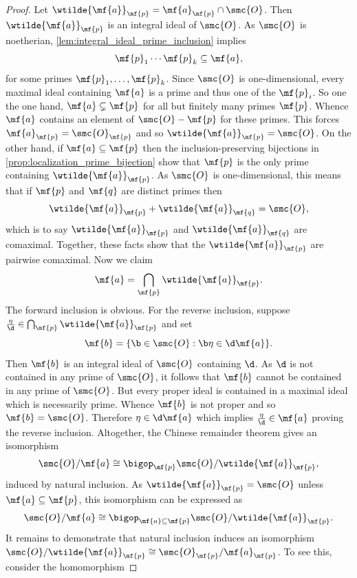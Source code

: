     \begin{proof}
      Let \(\wtilde{\mf{a}}_{\mf{p}} = \mf{a}_{\mf{p}} \cap \smc{O}\). Then \(\wtilde{\mf{a}}_{\mf{p}}\) is an integral ideal of \(\smc{O}\). As \(\smc{O}\) is noetherian, \cref{lem:integral_ideal_prime_inclusion} implies
      \[
        \mf{p}_{1} \cdots \mf{p}_{k} \subseteq \mf{a},
      \]
      for some primes \(\mf{p}_{1},\ldots,\mf{p}_{k}\). Since \(\smc{O}\) is one-dimensional, every maximal ideal containing \(\mf{a}\) is a prime and thus one of the \(\mf{p}_{i}\). So one the one hand, \(\mf{a} \subsetneq \mf{p}\) for all but finitely many primes \(\mf{p}\). Whence \(\mf{a}\) contains an element of \(\smc{O}-\mf{p}\) for these primes. This forces \(\mf{a}_{\mf{p}} = \smc{O}_{\mf{p}}\) and so \(\wtilde{\mf{a}}_{\mf{p}} = \smc{O}\). On the other hand, if \(\mf{a} \subseteq \mf{p}\) then the inclusion-preserving bijections in \cref{prop:localization_prime_bijection} show that \(\mf{p}\) is the only prime containing \(\wtilde{\mf{a}}_{\mf{p}}\). As \(\smc{O}\) is one-dimensional, this means that if \(\mf{p}\) and \(\mf{q}\) are distinct primes then
      \[
        \wtilde{\mf{a}}_{\mf{p}}+\wtilde{\mf{a}}_{\mf{q}} = \smc{O},
      \]
      which is to say \(\wtilde{\mf{a}}_{\mf{p}}\) and \(\wtilde{\mf{a}}_{\mf{q}}\) are comaximal. Together, these facts show that the \(\wtilde{\mf{a}}_{\mf{p}}\) are pairwise comaximal. Now we claim
      \[
        \mf{a} = \bigcap_{\mf{p}}\wtilde{\mf{a}}_{\mf{p}}.
      \]
      The forward inclusion is obvious. For the reverse inclusion, suppose \(\frac{\eta}{\d} \in \bigcap_{\mf{p}}\wtilde{\mf{a}}_{\mf{p}}\) and set
      \[
        \mf{b} = \{\b \in \smc{O}:\b\eta \in \d\mf{a}\}.
      \]
      Then \(\mf{b}\) is an integral ideal of \(\smc{O}\) containing \(\d\). As \(\d\) is not contained in any prime of \(\smc{O}\), it follows that \(\mf{b}\) cannot be contained in any prime of \(\smc{O}\). But every proper ideal is contained in a maximal ideal which is necessarily prime. Whence \(\mf{b}\) is not proper and so \(\mf{b} = \smc{O}\). Therefore \(\eta \in \d\mf{a}\) which implies \(\frac{\eta}{\d} \in \mf{a}\) proving the reverse inclusion. Altogether, the Chinese remainder theorem gives an isomorphism
      \[
        \smc{O}/\mf{a} \cong \bigop_{\mf{p}}\smc{O}/\wtilde{\mf{a}}_{\mf{p}},
      \]
      induced by natural inclusion. As \(\wtilde{\mf{a}}_{\mf{p}} = \smc{O}\) unless \(\mf{a} \subseteq \mf{p}\), this isomorphism can be expressed as
      \[
        \smc{O}/\mf{a} \cong \bigop_{\mf{a} \subseteq \mf{p}}\smc{O}/\wtilde{\mf{a}}_{\mf{p}}.
      \]
       It remains to demonstrate that natural inclusion induces an isomorphism \(\smc{O}/\wtilde{\mf{a}}_{\mf{p}} \cong \smc{O}_{\mf{p}}/\mf{a}_{\mf{p}}\). To see this, consider the homomorphism

\end{proof}
